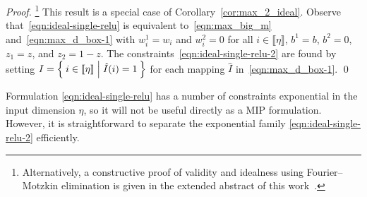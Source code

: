 \documentclass[smallextended]{svjour3}
\begin{document}
\begin{proof}\footnote{Alternatively, a constructive proof of validity and idealness using Fourier--Motzkin elimination is given in the extended abstract of this work~\cite[Proposition 1]{Anderson:2019}.}
This result is a special case of Corollary~\ref{cor:max_2_ideal}. Observe that~\eqref{eqn:ideal-single-relu} is equivalent to~\eqref{eqn:max_big_m} and~\eqref{eqn:max_d_box-1} with $w^1_i=w_i$ and $w^2_i=0$ for all $i \in \llbracket \eta \rrbracket$, $b^1=b$, $b^2=0$, $z_1=z$, and $z_2=1-z$. The constraints~\eqref{eqn:ideal-single-relu-2} are found by setting $I=\Set{i \in \llbracket\eta\rrbracket | \hat{I}(i)=1}$ for each mapping $\hat{I}$ in~\eqref{eqn:max_d_box-1}.
\qed \end{proof}


Formulation \eqref{eqn:ideal-single-relu} has a number of constraints exponential in the input dimension $\eta$, so it will not be useful directly as a MIP formulation. However, it is straightforward to separate the exponential family \eqref{eqn:ideal-single-relu-2} efficiently.
\end{document}
